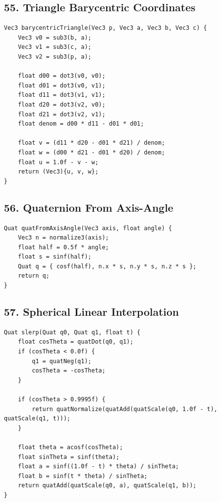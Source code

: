 \documentclass[10pt,letterpaper]{article}
\begin{document}
\subsection*{55. Triangle Barycentric Coordinates}

\begin{verbatim}
Vec3 barycentricTriangle(Vec3 p, Vec3 a, Vec3 b, Vec3 c) {
    Vec3 v0 = sub3(b, a);
    Vec3 v1 = sub3(c, a);
    Vec3 v2 = sub3(p, a);

    float d00 = dot3(v0, v0);
    float d01 = dot3(v0, v1);
    float d11 = dot3(v1, v1);
    float d20 = dot3(v2, v0);
    float d21 = dot3(v2, v1);
    float denom = d00 * d11 - d01 * d01;

    float v = (d11 * d20 - d01 * d21) / denom;
    float w = (d00 * d21 - d01 * d20) / denom;
    float u = 1.0f - v - w;
    return (Vec3){u, v, w};
}
\end{verbatim}

\subsection*{56. Quaternion From Axis-Angle}

\begin{verbatim}
Quat quatFromAxisAngle(Vec3 axis, float angle) {
    Vec3 n = normalize3(axis);
    float half = 0.5f * angle;
    float s = sinf(half);
    Quat q = { cosf(half), n.x * s, n.y * s, n.z * s };
    return q;
}
\end{verbatim}

\subsection*{57. Spherical Linear Interpolation}

\begin{verbatim}
Quat slerp(Quat q0, Quat q1, float t) {
    float cosTheta = quatDot(q0, q1);
    if (cosTheta < 0.0f) {
        q1 = quatNeg(q1);
        cosTheta = -cosTheta;
    }

    if (cosTheta > 0.9995f) {
        return quatNormalize(quatAdd(quatScale(q0, 1.0f - t), quatScale(q1, t)));
    }

    float theta = acosf(cosTheta);
    float sinTheta = sinf(theta);
    float a = sinf((1.0f - t) * theta) / sinTheta;
    float b = sinf(t * theta) / sinTheta;
    return quatAdd(quatScale(q0, a), quatScale(q1, b));
}
\end{verbatim}
\end{document}
